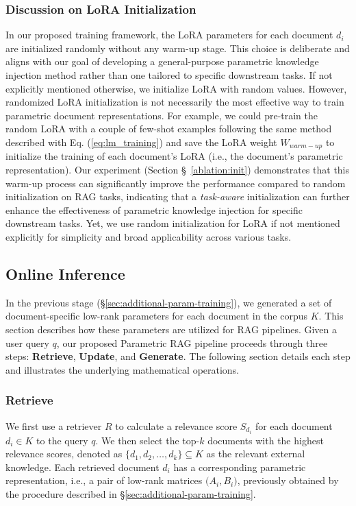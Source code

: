 \documentclass[sigconf,natbib=true,anonymous=false]{acmart}
\begin{document}
\subsubsection{Discussion on LoRA Initialization} \label{sec:lora-init-discussion}

In our proposed training framework, the LoRA parameters for each document $d_i$ are initialized randomly without any warm-up stage. This choice is deliberate and aligns with our goal of developing a general-purpose parametric knowledge injection method rather than one tailored to specific downstream tasks. 
If not explicitly mentioned otherwise, we initialize LoRA with random values.
However, randomized LoRA initialization is not necessarily the most effective way to train parametric document representations.
For example, we could pre-train the random LoRA with a couple of few-shot examples following the same method described with Eq. (\ref{eq:lm_training}) and save the LoRA weight $W_{warm-up}$ to initialize the training of each document's LoRA (i.e., the document's parametric representation).
Our experiment (Section \S ~\ref{ablation:init}) demonstrates that this warm-up process can significantly improve the performance compared to random initialization on RAG tasks, indicating that a \emph{task-aware} initialization can further enhance the effectiveness of parametric knowledge injection for specific downstream tasks.
Yet, we use random initialization for LoRA if not mentioned explicitly for simplicity and broad applicability across various tasks.






\subsection{Online Inference}
\label{sec:inference}

In the previous stage (\S\ref{sec:additional-param-training}), we generated a set of document-specific low-rank parameters for each document in the corpus \(K\). 
This section describes how these parameters are utilized for RAG pipelines. 
Given a user query \(q\), our proposed Parametric RAG pipeline proceeds through three steps: 
\textbf{Retrieve}, \textbf{Update}, and \textbf{Generate}.
The following section details each step and illustrates the underlying mathematical operations.

\subsubsection{Retrieve}
We first use a retriever \(R\) to calculate a relevance score \(S_{d_i}\) for each document \(d_i\in K\) to the query \(q\). 
We then select the top-\(k\) documents with the highest relevance scores, denoted as \(\{d_{1}, d_{2}, \dots, d_{k}\}\subseteq K\) as the relevant external knowledge. 
Each retrieved document \(d_{i}\) has a corresponding parametric representation, i.e., a pair of low-rank matrices \(\bigl(A_{i}, B_{i}\bigr)\), previously obtained by the procedure described in \S\ref{sec:additional-param-training}. 
\end{document}
